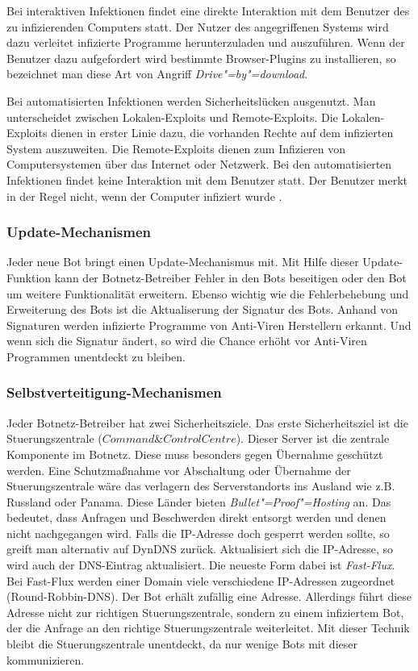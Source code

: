 Bei interaktiven Infektionen findet eine direkte Interaktion mit dem
Benutzer des zu infizierenden Computers statt. Der Nutzer des angegriffenen Systems 
wird dazu verleitet infizierte Programme herunterzuladen und auszuführen. Wenn
der Benutzer dazu aufgefordert wird bestimmte Browser-Plugins zu installieren,
so bezeichnet man diese Art von Angriff \emph{Drive"=by"=download}. 

Bei automatisierten Infektionen werden Sicherheitslücken ausgenutzt. Man
unterscheidet zwischen Lokalen-Exploits und Remote-Exploits. Die Lokalen-Exploits
dienen in erster Linie dazu, die vorhanden Rechte auf dem infizierten System
auszuweiten. Die Remote-Exploits dienen zum Infizieren von Computersystemen
über das Internet oder Netzwerk. Bei den automatisierten Infektionen findet
keine Interaktion mit dem Benutzer statt. Der Benutzer merkt in der Regel nicht,
wenn der Computer infiziert wurde \cite{baier}.

\subsubsection{Update-Mechanismen}
Jeder neue Bot bringt einen Update-Mechanismus mit. Mit Hilfe dieser Update-Funktion 
kann der Botnetz-Betreiber Fehler in den Bots beseitigen oder den Bot um weitere 
Funktionalität erweitern. Ebenso wichtig wie die Fehlerbehebung und Erweiterung
des Bots ist die Aktualiserung der Signatur des Bots. Anhand von Signaturen
werden infizierte Programme von Anti-Viren Herstellern erkannt. Und wenn sich die 
Signatur ändert, so wird die Chance erhöht vor Anti-Viren Programmen unentdeckt
zu bleiben.

\subsubsection{Selbstverteitigung-Mechanismen}
Jeder Botnetz-Betreiber hat zwei Sicherheitsziele. Das erste Sicherheitsziel
ist die Stuerungszentrale ($Command \& Control Centre$). Dieser Server ist die 
zentrale Komponente im Botnetz. Diese muss besonders gegen Übernahme geschützt werden.
Eine Schutzmaßnahme vor Abschaltung oder Übernahme der Stuerungszentrale wäre
das verlagern des Serverstandorts ins Ausland wie z.B. Russland oder Panama.
Diese Länder bieten \emph{Bullet"=Proof"=Hosting} an. Das bedeutet, dass Anfragen
und Beschwerden direkt entsorgt werden und denen nicht nachgegangen wird.
Falls die IP-Adresse doch gesperrt werden sollte, so greift man alternativ auf DynDNS
zurück. Aktualisiert sich die IP-Adresse, so wird auch der DNS-Eintrag aktualisiert.
Die neueste Form dabei ist \emph{Fast-Flux}. Bei Fast-Flux werden einer Domain 
viele verschiedene IP-Adressen zugeordnet (Round-Robbin-DNS). Der Bot erhält zufällig 
eine Adresse. Allerdings führt diese Adresse nicht zur richtigen Stuerungszentrale,
sondern zu einem infiziertem Bot, der die Anfrage an den richtige Stuerungszentrale
weiterleitet. Mit dieser Technik bleibt die Stuerungszentrale unentdeckt, da
nur wenige Bots mit dieser kommunizieren.

